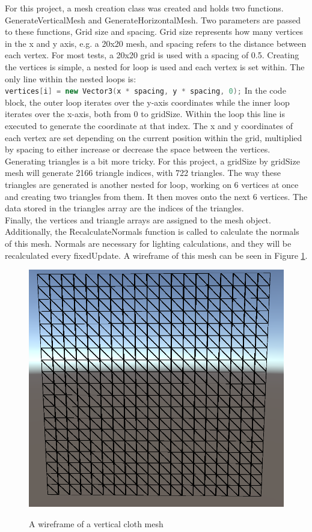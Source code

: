\documentclass[12pt,a4paper]{article}
\begin{document}
For this project, a mesh creation class was created and holds two functions. GenerateVerticalMesh and GenerateHorizontalMesh. Two parameters are passed to these functions, Grid size and spacing. Grid size represents how many vertices in the x and y axis, e.g. a 20x20 mesh, and spacing refers to the distance between each vertex. For most tests, a 20x20 grid is used with a spacing of 0.5. Creating the vertices is simple, a nested for loop is used and each vertex is set within. The only line within the nested loops is:\\ \lstinline[language=C++]!vertices[i] = new Vector3(x * spacing, y * spacing, 0);!
In the code block, the outer loop iterates over the y-axis coordinates while the inner loop iterates over the x-axis, both from 0 to gridSize. Within the loop this line is executed to generate the coordinate at that index. The x and y coordinates of each vertex are set depending on the current position within the grid, multiplied by spacing to either increase or decrease the space between the vertices.\\

Generating triangles is a bit more tricky. For this project, a gridSize by gridSize mesh will generate 2166 triangle indices, with 722 triangles. The way these triangles are generated is another nested for loop, working on 6 vertices at once and creating two triangles from them. It then moves onto the next 6 vertices. The data stored in the triangles array are the indices of the triangles. \\

Finally, the vertices and triangle arrays are assigned to the mesh object. Additionally, the RecalculateNormals function is called to calculate the normals of this mesh. Normals are necessary for lighting calculations, and they will be recalculated every fixedUpdate. A wireframe of this mesh can be seen in Figure \ref{fig:mesh}.
\newpage
\begin{figure}
	\centering
	\caption{A wireframe of a vertical cloth mesh}
	\includegraphics[scale=0.5]{clothmesh.png}
	\label{fig:mesh}
\end{figure}
\end{document}
